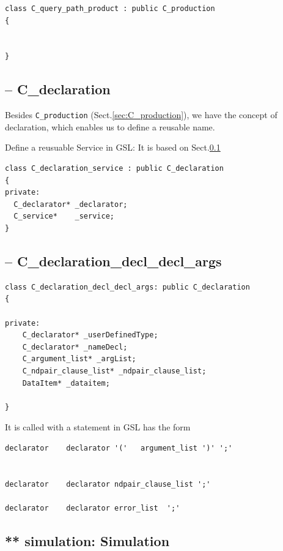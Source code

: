 \begin{verbatim}
class C_query_path_product : public C_production
{


}
\end{verbatim}

\subsection{-- C\_declaration}
\label{sec:C_declaration}

Besides \verb!C_production! (Sect.\ref{sec:C_production}), we have the concept
of declaration, which enables us to define a reusable name.

Define a reusuable Service in GSL:
\label{sec:C_declaration_service} It is based on Sect.\ref{sec:C_declaration}
\begin{verbatim}
class C_declaration_service : public C_declaration
{
private:
  C_declarator* _declarator;
  C_service*    _service;
}
\end{verbatim}

\subsection{-- C\_declaration\_decl\_decl\_args}
\label{sec:C_declaration_decl_decl_args}

\begin{lstlisting}
class C_declaration_decl_decl_args: public C_declaration
{

private:
    C_declarator* _userDefinedType;
    C_declarator* _nameDecl;
    C_argument_list* _argList;
    C_ndpair_clause_list* _ndpair_clause_list;
    DataItem* _dataitem;

}
\end{lstlisting}

It is called with a statement in GSL has the form
\begin{verbatim}
declarator    declarator '('   argument_list ')' ';'


declarator    declarator ndpair_clause_list ';'

declarator    declarator error_list  ';'
\end{verbatim}






\subsection{ ** simulation: Simulation}
\label{sec:MGS-framework-simulation}
\label{sec:GSL-phase-simulation}
\label{sec:Simulation-class-GSL}
\label{sec:Iteration}

